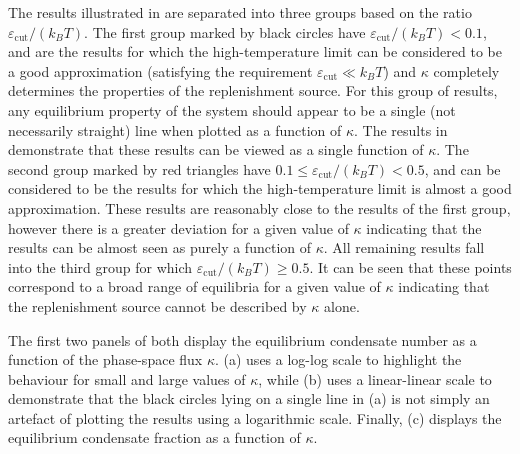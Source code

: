 The results illustrated in  are separated into three groups based on the ratio $\varepsilon_\text{cut}/(k_B T)$.  The first group marked by black circles have $\varepsilon_\text{cut}/(k_B T) < 0.1$, and are the results for which the high-temperature limit can be considered to be a good approximation (satisfying the requirement $\varepsilon_\text{cut} \ll k_B T$) and $\kappa$ completely determines the properties of the replenishment source.  For this group of results, any equilibrium property of the system should appear to be a single (not necessarily straight) line when plotted as a function of $\kappa$.  The results in  demonstrate that these results can be viewed as a single function of $\kappa$.  The second group marked by red triangles have $0.1 \leq \varepsilon_\text{cut}/(k_B T) < 0.5$, and can be considered to be the results for which the high-temperature limit is almost a good approximation.  These results are reasonably close to the results of the first group, however there is a greater deviation for a given value of $\kappa$ indicating that the results can be almost seen as purely a function of $\kappa$. All remaining results fall into the third group for which $\varepsilon_\text{cut}/(k_B T) \geq 0.5$.  It can be seen that these points correspond to a broad range of equilibria for a given value of $\kappa$ indicating that the replenishment source cannot be described by $\kappa$ alone.

The first two panels of  both display the equilibrium condensate number as a function of the phase-space flux $\kappa$.  (a) uses a log-log scale to highlight the behaviour for small and large values of $\kappa$, while (b) uses a linear-linear scale to demonstrate that the black circles lying on a single line in (a) is not simply an artefact of plotting the results using a logarithmic scale.  Finally, (c) displays the equilibrium condensate fraction as a function of $\kappa$.

